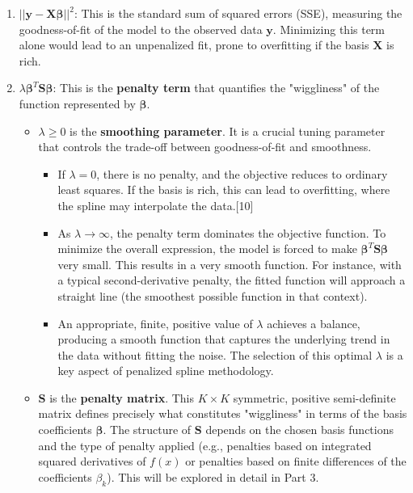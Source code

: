 \documentclass[11pt, a4paper]{article}
\begin{document}
\begin{enumerate}
 \item $||\mathbf{y} - \mathbf{X}\boldsymbol{\beta}||^2$: This is the standard sum of squared errors (SSE), measuring the goodness-of-fit of the model to the observed data $\mathbf{y}$. Minimizing this term alone would lead to an unpenalized fit, prone to overfitting if the basis $\mathbf{X}$ is rich.
 \item $\lambda \boldsymbol{\beta}^T \mathbf{S} \boldsymbol{\beta}$: This is the \textbf{penalty term} that quantifies the "wiggliness" of the function represented by $\boldsymbol{\beta}$.
 \begin{itemize}
  \item $\lambda \ge 0$ is the \textbf{smoothing parameter}. It is a crucial tuning parameter that controls the trade-off between goodness-of-fit and smoothness.
  \begin{itemize}
\item If $\lambda = 0$, there is no penalty, and the objective reduces to ordinary least squares. If the basis is rich, this can lead to overfitting, where the spline may interpolate the data.[10]
\item As $\lambda \rightarrow \infty$, the penalty term dominates the objective function. To minimize the overall expression, the model is forced to make $\boldsymbol{\beta}^T \mathbf{S} \boldsymbol{\beta}$ very small. This results in a very smooth function. For instance, with a typical second-derivative penalty, the fitted function will approach a straight line (the smoothest possible function in that context).
\item An appropriate, finite, positive value of $\lambda$ achieves a balance, producing a smooth function that captures the underlying trend in the data without fitting the noise. The selection of this optimal $\lambda$ is a key aspect of penalized spline methodology.
  \end{itemize}
  \item $\mathbf{S}$ is the \textbf{penalty matrix}. This $K \times K$ symmetric, positive semi-definite matrix defines precisely what constitutes "wiggliness" in terms of the basis coefficients $\boldsymbol{\beta}$. The structure of $\mathbf{S}$ depends on the chosen basis functions and the type of penalty applied (e.g., penalties based on integrated squared derivatives of $f(x)$ or penalties based on finite differences of the coefficients $\beta_k$). This will be explored in detail in Part 3.
 \end{itemize}
\end{enumerate}
\end{document}
